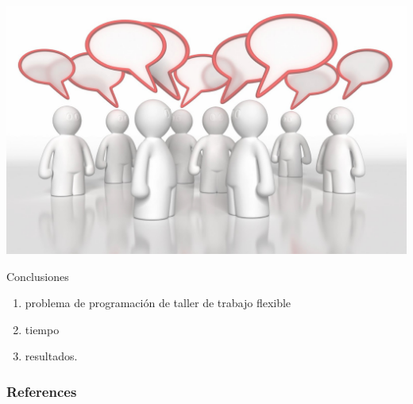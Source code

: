 \documentclass{beamer}
\newcommand{\fjssp}{problema de programación de taller de trabajo flexible}
\begin{document}
{
{
    \includegraphics[width=\paperwidth,height=\paperheight]{discussion.jpg}
}
\begin{frame}{Conclusiones}
\begin{enumerate}
	\item \fjssp
	\item tiempo
	\item resultados.
\end{enumerate}

\end{frame}
}

\begin{frame}[allowframebreaks] %
	\frametitle{References}
	
	
	
\end{frame}
\end{document}
